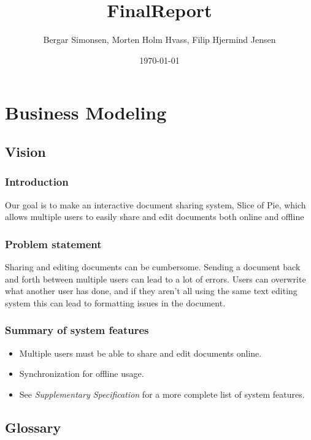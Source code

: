 \documentclass[11pt]{article}
\title{FinalReport}
\author{Bergar Simonsen, Morten Holm Hvass, Filip Hjermind Jensen}
\date{\today}
\begin{document}
\maketitle

\setcounter{tocdepth}{3}
\tableofcontents
\vspace*{1cm}
\section{Business Modeling}
\label{sec-1}
\subsection{Vision}
\label{sec-1-1}
\subsubsection{Introduction}
\label{sec-1-1-1}

Our goal is to make an interactive document sharing system, Slice of Pie,  which allows multiple users to easily share and edit documents both online and offline
\subsubsection{Problem statement}
\label{sec-1-1-2}

    Sharing and editing documents can be cumbersome. 
    Sending a document back and forth between multiple users can lead to a lot of errors. Users can overwrite what another user has done, and if they aren't all
    using the same text editing system this can lead to formatting issues in the document.
\subsubsection{Summary of system features}
\label{sec-1-1-3}

\begin{itemize}
\item Multiple users must be able to share and edit documents online.
\item Synchronization for offline usage.
\item See \emph{Supplementary Specification} for a more complete list of system features.
\end{itemize}
\subsection{Glossary}
\label{sec-1-2}
\end{document}
